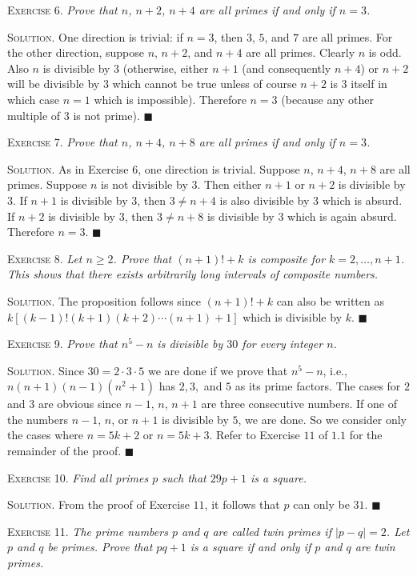 \documentclass[11pt, leqno]{article}
\newcommand{\done}{\ensuremath{\blacksquare}}
\begin{document}
\textsc{Exercise 6}. \emph{Prove that $n$, $n+2$, $n+4$ are all primes if and only if $n=3$.}

\textsc{Solution}. One direction is trivial: if $n=3$, then $3$, $5$, and $7$ are all primes. For the other direction, suppose $n$, $n+2$, and $n+4$ are all primes. Clearly $n$ is odd. Also $n$ is divisible by $3$ (otherwise, either $n+1$ (and consequently $n+4$) or $n+2$ will be divisible by $3$ which cannot be true unless of course $n+2$ is $3$ itself in which case $n=1$ which is impossible). Therefore $n=3$ (because any other multiple of 3 is not prime). \done

\textsc{Exercise 7}. \emph{Prove that $n$, $n+4$, $n+8$ are all primes if and only if $n=3$.}

\textsc{Solution}. As in Exercise 6, one direction is trivial. Suppose $n$, $n+4$, $n+8$ are all primes. Suppose $n$ is not divisible by $3$. Then either $n+1$ or $n+2$ is divisible by $3$. If $n+1$ is divisible by $3$, then $3 \ne n+4$ is also divisible by $3$ which is absurd. If $n+2$ is divisible by $3$, then $3 \ne n+8$ is divisible by $3$ which is again absurd. Therefore $n=3$. \done

\textsc{Exercise 8}. \emph{Let $n \geq 2$. Prove that $(n+1)! + k$ is composite for $k= 2, \ldots, n+1$. This shows that there exists arbitrarily long intervals of composite numbers.}

\textsc{Solution}. The proposition follows since $(n+1)!+k$ can also be written as $k[(k-1)!(k+1)(k+2)\cdots (n+1) + 1]$ which is divisible by $k$. \done

\textsc{Exercise 9}. \emph{Prove that $n^5-n$ is divisible by $30$ for every integer $n$.}

\textsc{Solution}. Since $30 = 2\cdot 3\cdot 5$ we are done if we prove that $n^5-n$, i.e., $n(n+1)(n-1)(n^2+1)$ has $2, 3,$ and $5$ as its prime factors. The cases for $2$ and $3$ are obvious since $n-1$, $n$, $n+1$ are three consecutive numbers. If one of the numbers $n-1$, $n$, or $n+1$ is divisible by $5$, we are done. So we consider only the cases where $n=5k+2$ or $n=5k+3$. Refer to Exercise $11$ of $1.1$ for the remainder of the proof. \done

\textsc{Exercise 10}. \emph{Find all primes $p$ such that $29p+1$ is a square.}

\textsc{Solution}. From the proof of Exercise $11$, it follows that $p$ can only be $31$. \done

\textsc{Exercise 11}. \emph{The prime numbers $p$ and $q$ are called twin primes if $|p-q|=2$. Let $p$ and $q$ be primes. Prove that $pq+1$ is a square if and only if $p$ and $q$ are twin primes.}
\end{document}
